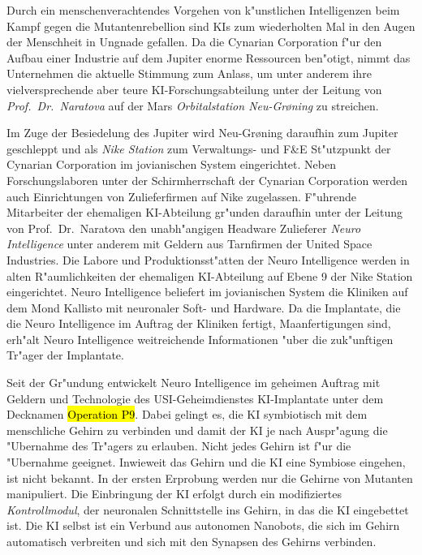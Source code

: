 

Durch ein menschenverachtendes Vorgehen von k"unstlichen Intelligenzen beim Kampf gegen die Mutantenrebellion sind KIs zum wiederholten Mal in den Augen der Menschheit in Ungnade gefallen. Da die Cynarian Corporation f"ur den Aufbau einer Industrie auf dem Jupiter enorme Ressourcen ben"otigt, nimmt das Unternehmen die aktuelle Stimmung zum Anlass, um unter anderem ihre vielversprechende aber teure KI-Forschungsabteilung unter der Leitung von \emph{Prof.~Dr.~Naratova} auf der Mars \emph{Orbitalstation Neu-Gr{\o}ning} zu streichen.

Im Zuge der Besiedelung des Jupiter wird Neu-Gr{\o}ning daraufhin zum Jupiter geschleppt und als \emph{Nike Station} zum Verwaltungs- und F\&E St"utzpunkt der Cynarian Corporation im jovianischen System eingerichtet. Neben Forschungslaboren unter der Schirmherrschaft der Cynarian Corporation werden auch Einrichtungen von Zulieferfirmen auf Nike zugelassen. F"uhrende Mitarbeiter der ehemaligen KI-Abteilung gr"unden daraufhin unter der Leitung von Prof.~Dr.~Naratova den unabh"angigen Headware Zulieferer \emph{Neuro Intelligence} unter anderem mit Geldern aus Tarnfirmen der United Space Industries. Die Labore und Produktionsst"atten der Neuro Intelligence werden in alten R"aumlichkeiten der ehemaligen KI-Abteilung auf Ebene 9 der Nike Station eingerichtet. Neuro Intelligence beliefert im jovianischen System die Kliniken auf dem Mond Kallisto mit neuronaler Soft- und Hardware. Da die Implantate, die die Neuro Intelligence im Auftrag der Kliniken fertigt, Ma\3anfertigungen sind, erh"alt Neuro Intelligence weitreichende Informationen "uber die zuk"unftigen Tr"ager der Implantate.

Seit der Gr"undung entwickelt Neuro Intelligence im geheimen Auftrag mit Geldern und Technologie des USI-Geheimdienstes KI-Implantate unter dem Decknamen \hl{Operation P9}. Dabei gelingt es, die KI symbiotisch mit dem menschliche Gehirn zu verbinden und damit der KI je nach Auspr"agung die "Ubernahme des Tr"agers zu erlauben. Nicht jedes Gehirn ist f"ur die "Ubernahme geeignet. Inwieweit das Gehirn und die KI eine Symbiose eingehen, ist nicht bekannt. In der ersten Erprobung werden nur die Gehirne von Mutanten manipuliert. Die Einbringung der KI erfolgt durch ein modifiziertes \emph{Kontrollmodul}, der neuronalen Schnittstelle ins Gehirn, in das die KI eingebettet ist. Die KI selbst ist ein Verbund aus autonomen Nanobots, die sich im Gehirn automatisch verbreiten und sich mit den Synapsen des Gehirns verbinden.

